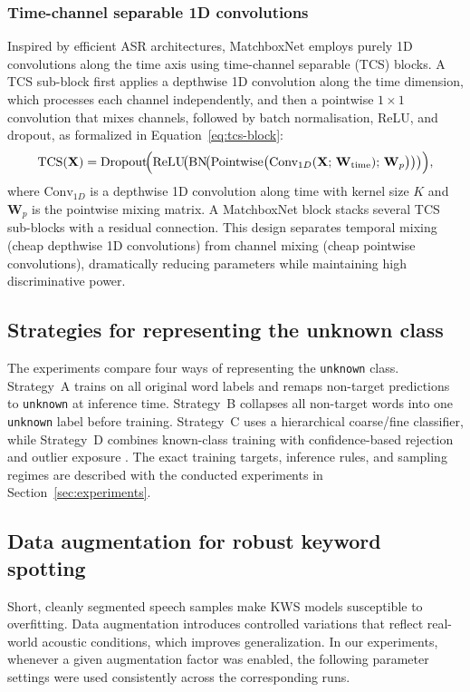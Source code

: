\documentclass[11pt]{article}
\begin{document}
\subsubsection{Time-channel separable 1D convolutions}
Inspired by efficient ASR architectures, MatchboxNet \cite{matchbox} employs purely 1D convolutions along the time axis using time-channel separable (TCS) blocks.
A TCS sub-block first applies a depthwise 1D convolution along the time dimension, which processes each channel independently, and then a pointwise $1\times1$ convolution that mixes channels, followed by batch normalisation, ReLU, and dropout, as formalized in Equation~\eqref{eq:tcs-block}:
\begin{equation}
    \label{eq:tcs-block}
    \text{TCS}(\mathbf{X}) = \text{Dropout}\!\Bigl(\text{ReLU}\!\bigl(\text{BN}\!\bigl(\text{Pointwise}\bigl(\text{Conv}_{1D}(\mathbf{X};\,\mathbf{W}_{\text{time}});\, \mathbf{W}_p\bigr)\bigr)\bigr)\Bigr),
\end{equation}
where $\text{Conv}_{1D}$ is a depthwise 1D convolution along time with kernel size $K$ and $\mathbf{W}_p$ is the pointwise mixing matrix.
A MatchboxNet block stacks several TCS sub-blocks with a residual connection.
This design separates temporal mixing (cheap depthwise 1D convolutions) from channel mixing (cheap pointwise convolutions), dramatically reducing parameters while maintaining high discriminative power.

\subsection{Strategies for representing the unknown class}
The experiments compare four ways of representing the \texttt{unknown} class. Strategy~A trains on all original word labels and remaps non-target predictions to \texttt{unknown} at inference time. Strategy~B collapses all non-target words into one \texttt{unknown} label before training. Strategy~C uses a hierarchical coarse/fine classifier, while Strategy~D combines known-class training with confidence-based rejection and outlier exposure \cite{oe}. The exact training targets, inference rules, and sampling regimes are described with the conducted experiments in Section~\ref{sec:experiments}.

\subsection{Data augmentation for robust keyword spotting}
Short, cleanly segmented speech samples make KWS models susceptible to overfitting. 
Data augmentation introduces controlled variations that reflect real-world acoustic conditions, which improves generalization.
In our experiments, whenever a given augmentation factor was enabled, the following parameter settings were used consistently across the corresponding runs.
\end{document}
